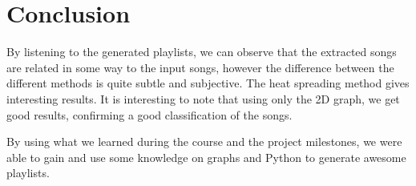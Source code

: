 \documentclass[11pt,a4paper,twoside]{article}
\begin{document}
\section{Conclusion}
By listening to the generated playlists, we can observe that the extracted songs are related in some way to the input songs, however the difference between the different methods is quite subtle and subjective. The heat spreading method gives interesting results. 
It is interesting to note that using only the 2D graph, we get good results, confirming a good classification of the songs. 

By using what we learned during the course and the project milestones, we were able to gain and use some knowledge on graphs and Python to generate awesome playlists.
\end{document}
